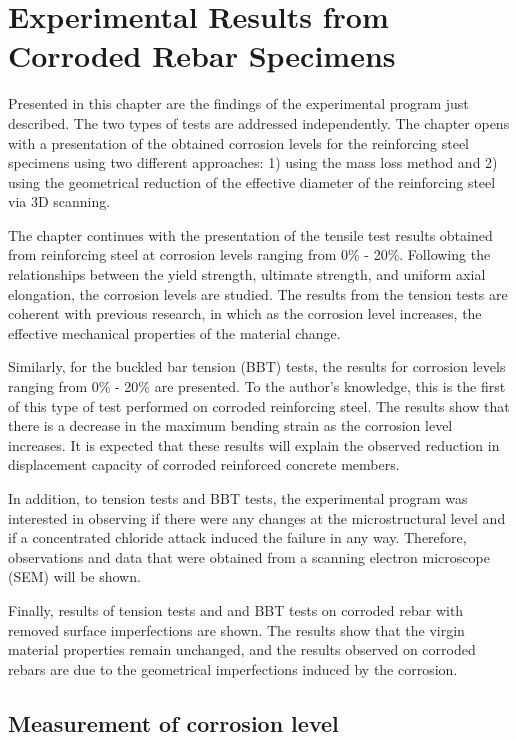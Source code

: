 \chapter{Experimental Results from Corroded Rebar Specimens}
\label{chap-four}
Presented in this chapter are the findings of the experimental program just described. The two types of tests are addressed independently. The chapter opens with a presentation of the obtained corrosion levels for the reinforcing steel specimens using two different approaches: 1) using the mass loss method and 2) using the geometrical reduction of the effective diameter of the reinforcing steel via 3D scanning. 

The chapter continues with the presentation of the tensile test results obtained from reinforcing steel at corrosion levels ranging from 0\% - 20\%. Following the relationships between the yield strength, ultimate strength, and uniform axial elongation, the corrosion levels are studied. The results from the tension tests are coherent with previous research, in which as the corrosion level increases, the effective mechanical properties of the material change. 

Similarly, for the buckled bar tension (BBT) tests, the results for corrosion levels ranging from 0\% - 20\% are presented. To the author’s knowledge, this is the first of this type of test performed on corroded reinforcing steel. The results show that there is a decrease in the maximum bending strain as the corrosion level increases. It is expected that these results will explain the observed reduction in displacement capacity of corroded reinforced concrete members. 

In addition, to tension tests and BBT tests, the experimental program was interested in observing if there were any changes at the microstructural level and if a concentrated chloride attack induced the failure in any way. Therefore, observations and data that were obtained from a scanning electron microscope (SEM) will be shown.

Finally, results of tension tests and and BBT tests on corroded rebar with removed surface imperfections are shown. The results show that the virgin material properties remain unchanged, and the results observed on corroded rebars are due to the geometrical imperfections induced by the corrosion.

\section{Measurement of corrosion level}

